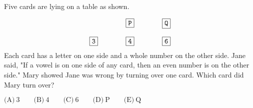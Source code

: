 

Five cards are lying on a table as shown.

\[\begin{matrix} & \qquad & \boxed{\tt{P}} & \qquad & \boxed{\tt{Q}} \\  \\ \boxed{\tt{3}} & \qquad & \boxed{\tt{4}} & \qquad & \boxed{\tt{6}} \end{matrix}\]
Each card has a letter on one side and a whole number on the other side. Jane said, "If a vowel is on one side of any card, then an even number is on the other side." Mary showed Jane was wrong by turning over one card. Which card did Mary turn over?

$\text{(A)}\ 3 \qquad \text{(B)}\ 4 \qquad \text{(C)}\ 6 \qquad \text{(D)}\ \text{P} \qquad \text{(E)}\ \text{Q}$
